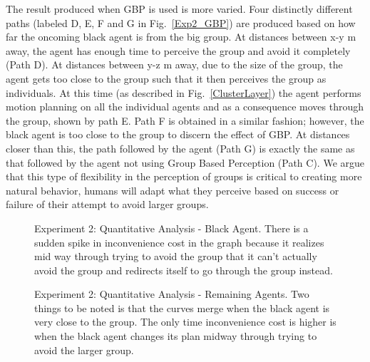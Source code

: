 \documentclass[runningheads,a4paper]{llncs}
\begin{document}
The result produced when GBP is used is more varied. Four distinctly different paths (labeled D, E, F and G in Fig.~\ref{Exp2_GBP}) are produced based on how far the oncoming black agent is from the big group. At distances between x-y m away, the agent has enough time to perceive the group and avoid it completely (Path D). At distances between y-z m away, due to the size of the group, the agent gets too close to the group such that it then perceives the group as individuals. At this time (as described in Fig.~\ref{ClusterLayer}) the agent performs motion planning on all the individual agents and as a consequence moves through the group, shown by path E. Path F is obtained in a similar fashion; however, the black agent is too close to the group to discern the effect of GBP. At distances closer than this, the path followed by the agent (Path G) is exactly the same as that followed by the agent not using Group Based Perception (Path C). We argue that this type of flexibility in the perception of groups is critical to creating more natural behavior, humans will adapt what they perceive based on success or failure of their attempt to avoid larger groups. 

\begin{figure}[!t]
  \centering
  \hspace{1pt}
    \caption{Experiment 2: Quantitative Analysis - Black Agent. There is a sudden spike in inconvenience cost in the graph because it realizes mid way through trying to avoid the group that it can't actually avoid the group and redirects itself to go through the group instead.}
  \label{Exp2_QuantitativeAnalysisBlack}
\end{figure}          
  \begin{figure}[!t]
  \centering
  \hspace{1pt}
  \caption{Experiment 2: Quantitative Analysis - Remaining Agents. Two things to be noted is that the curves merge when the black agent is very close to the group. The only time inconvenience cost is higher is when the black agent changes its plan midway through trying to avoid the larger group.}
  \label{Exp2_QuantitativeAnalysisRemaining}
\end{figure}
\end{document}
